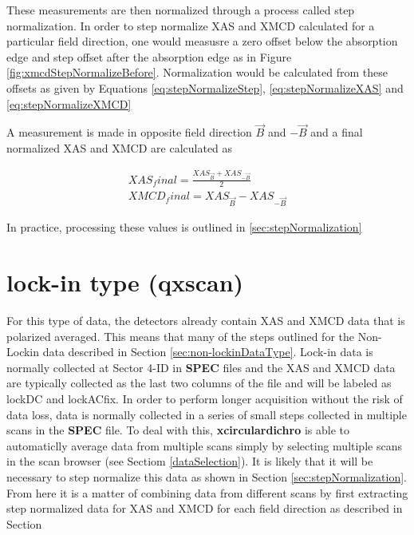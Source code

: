 \documentclass[12pt,letterpaper, openany]{book}
\begin{document}
\begin{appendices}
These measurements are then normalized through a process called step
normalization.  In order to step normalize XAS and XMCD calculated for a
particular field direction, one would measusre a zero offset below the
absorption edge and step offset after the absorption edge as in Figure
\ref{fig:xmcdStepNormalizeBefore}.  Normalization would be calculated from these
offsets as given by Equations \ref{eq:stepNormalizeStep},
\ref{eq:stepNormalizeXAS} and \ref{eq:stepNormalizeXMCD}

A measurement is made in opposite field direction $\vec{B}$ and $-\vec{B}$ and a
final normalized XAS and XMCD are calculated as

\begin{equation}
\begin{split}
XAS_final = \frac{XAS_{\vec{B}} + XAS_{-\vec{B}}}{2}
\\
XMCD_final = XAS_{\vec{B}} - XAS_{-\vec{B}}
\end{split}
\end{equation}

In practice, processing these values is outlined in \ref{sec:stepNormalization}



\section{lock-in type (qxscan)}\label{sec:lockinDataType}
For this type of data, the detectors already contain XAS and XMCD data that is
polarized averaged.  This means that many of the steps outlined for the
Non-Lockin data described in Section \ref{sec:non-lockinDataType}.  Lock-in data
is normally collected at Sector 4-ID in \textbf{SPEC} files and the XAS and XMCD
data are typically collected as the last two columns of the file and will be labeled as
lockDC and lockACfix.  In order to perform longer acquisition without the risk
of data loss, data is normally collected in a series of small steps collected in
multiple scans in the \textbf{SPEC} file.  To deal with this,
\textbf{xcirculardichro} is able to automaticlly average data from multiple
scans simply by selecting multiple scans in the scan browser (see Sectiom
\ref{dataSelection}).  It is likely that it will be necessary to step normalize
this data as shown in Section \ref{sec:stepNormalization}.  From here it is a
matter of combining data from different scans by first extracting step
normalized data for XAS and XMCD for each field direction as described in
Section 




\end{appendices}

\printbibliography
\end{document}
